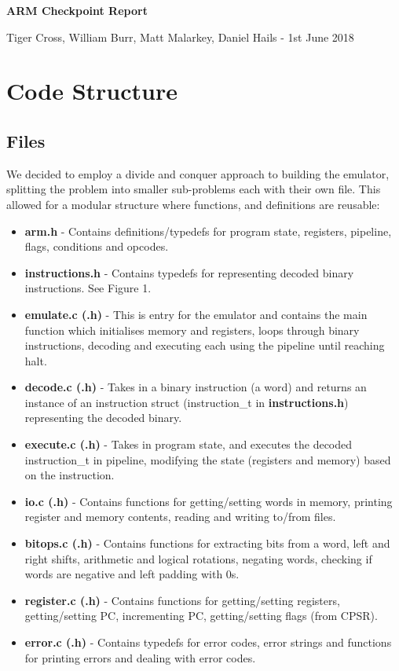 \documentclass[10pt,twoside]{article}
\begin{document}

\begin{center}
\LARGE\textbf{ARM Checkpoint Report}
\end{center}
\begin{center}
\small{Tiger Cross, William Burr, Matt Malarkey, Daniel Hails - 1st June 2018}
\end{center}

\section{Code Structure}
\subsection*{Files}
We decided to employ a divide and conquer approach to building the emulator, splitting the problem into smaller sub-problems each with their own file. This allowed for a modular structure where functions, and definitions are reusable:
\begin{itemize}
\item \textbf{arm.h} - Contains definitions/typedefs for program state, registers, pipeline, flags, conditions and opcodes.
\item \textbf{instructions.h} - Contains typedefs for representing decoded binary instructions. See Figure 1.
\item \textbf{emulate.c (.h)} - This is entry for the emulator and contains the main function which initialises memory and registers, loops through binary instructions, decoding and executing each using the pipeline until reaching halt. 
\item \textbf{decode.c (.h)} - Takes in a binary instruction (a word) and returns an instance of an instruction struct (instruction\_t in \textbf{instructions.h}) representing the decoded binary.
\item \textbf{execute.c (.h)} - Takes in program state, and executes the decoded instruction\_t in pipeline, modifying the state (registers and memory) based on the instruction.
\item \textbf{io.c (.h)} - Contains functions for getting/setting words in memory, printing register and memory contents, reading and writing to/from files. 
\item \textbf{bitops.c (.h)} - Contains functions for extracting bits from a word, left and right shifts, arithmetic and logical rotations, negating words, checking if words are negative and left padding with 0s.
\item \textbf{register.c (.h)} - Contains functions for getting/setting registers, getting/setting PC, incrementing PC, getting/setting flags (from CPSR).
\item \textbf{error.c (.h)} - Contains typedefs for error codes, error strings and functions for printing errors and dealing with error codes.
\end{itemize}
\end{document}
